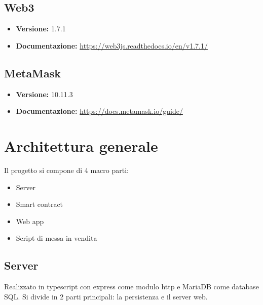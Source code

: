 \documentclass[a4paper, 12pt]{article}
\begin{document}
\subsection{Web3}
\begin{itemize}
\item \textbf{Versione:} 1.7.1
\item \textbf{Documentazione:} \href{https://web3js.readthedocs.io/en/v1.7.1/}{https://web3js.readthedocs.io/en/v1.7.1/}
\end{itemize}

\subsection{MetaMask}
\begin{itemize}
\item \textbf{Versione:} 10.11.3
\item \textbf{Documentazione:} \href{https://docs.metamask.io/guide/}{https://docs.metamask.io/guide/}
\end{itemize}

\section{Architettura generale}
Il progetto si compone di 4 macro parti:
\begin{itemize}
\item Server
\item Smart contract
\item Web app
\item Script di messa in vendita
\end{itemize}
\subsection{Server}
Realizzato in typescript con express come modulo http e MariaDB come database SQL.
Si divide in 2 parti principali: la persistenza e il server web.
\end{document}
